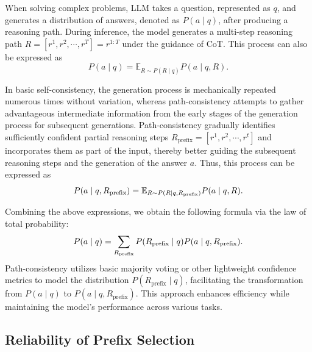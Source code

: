 When solving complex problems, LLM takes a question, represented as $q$, and generates a distribution of answers, denoted as $P(a\mid q)$, after producing a reasoning path. During inference, the model generates a multi-step reasoning path $ R = \left[ r^1, r^2, \cdots, r^T \right ] = r^{1:T}$  under the guidance of CoT. This process can also be expressed as 
\begin{equation}
    P(a\mid q)=\mathbb{E}_{R\sim P(R\mid q)}P(a\mid q,R).
\end{equation}

In basic self-consistency, the generation process is mechanically repeated numerous times without variation, whereas path-consistency attempts to gather advantageous intermediate information from the early stages of the generation process for subsequent generations. Path-consistency gradually identifies sufficiently confident partial reasoning steps $R_\text{prefix} = [r^1, r^2, \cdots, r^t]$ and incorporates them as part of the input, thereby better guiding the subsequent reasoning steps and the generation of the answer $a$. Thus, this process can be expressed as
\begin{equation}
\small
    P(a\mid q, R_\text{prefix})=\mathbb{E}_{R\sim P(R\mid q, R_\text{prefix})}P(a\mid q, R).
\end{equation}

Combining the above expressions, we obtain the following formula via the law of total probability:
\begin{equation}
\small
    P(a\mid q)=\sum_{R_{\text{prefix}}}P(R_{\text{prefix}}\mid q)P(a\mid q, R_{\text{prefix}}).
\end{equation}
Path-consistency utilizes basic majority voting or other lightweight confidence metrics to model the distribution $P(R_{\text{prefix}}\mid q)$, facilitating the transformation from $P(a\mid q)$ to $P(a\mid q, R_\text{prefix})$. This approach enhances efficiency while maintaining the model's performance across various tasks.

\subsection{Reliability of Prefix Selection} \label{sec:reliability}

